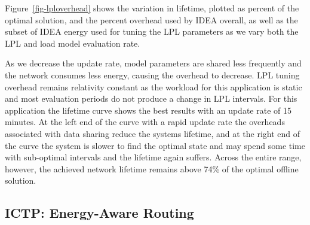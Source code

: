 Figure~\ref{fig-lploverhead} shows the variation in lifetime, plotted as
percent of the optimal solution, and the percent overhead used by IDEA
overall, as well as the subset of IDEA energy used for tuning the LPL
parameters as we vary both the LPL and load model evaluation rate. 

As we decrease the update rate, model parameters are shared less frequently
and the network consumes less energy, causing the overhead to decrease. LPL
tuning overhead remains relativity constant as the workload for this
application is static and most evaluation periods do not produce a change in
LPL intervals. For this application the lifetime curve shows the best results
with an update rate of 15 minutes. At the left end of the curve with a rapid
update rate the overheads associated with data sharing reduce the systems
lifetime, and at the right end of the curve the system is slower to find the
optimal state and may spend some time with sub-optimal intervals and the
lifetime again suffers. Across the entire range, however, the achieved
network lifetime remains above 74\% of the optimal offline solution.

\vfill\eject

\subsection{ICTP: Energy-Aware Routing}

